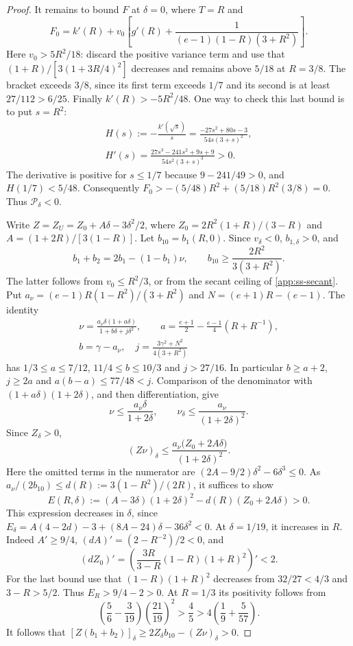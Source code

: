 \begin{proof}
It remains to bound $F$ at $\delta=0$, where $T=R$ and
\[
 F_0=k'(R)+v_0\left[g'(R)+
              \frac1{(e-1)(1-R)(3+R^2)}\right].
\]
Here $v_0>5R^2/18$: discard the positive variance term and use that
$(1+R)/[3(1+3R/4)^2]$ decreases and remains above $5/18$ at $R=3/8$.
The bracket exceeds $3/8$, since its first term exceeds $1/7$ and its second is at least
$27/112>6/25$. Finally $k'(R)>-5R^2/48$. One way to check this last bound is to put $s=R^2$:
\begin{gather*}
 H(s):=-\frac{k'(\sqrt s)}s
 =\frac{-27s^2+80s-3}{54s(3+s)^2},\\
 H'(s)=\frac{27s^3-241s^2+9s+9}{54s^2(3+s)^3}>0 .
\end{gather*}
The derivative is positive for $s\le1/7$ because $9-241/49>0$, and $H(1/7)<5/48$.
Consequently $F_0>-(5/48)R^2+(5/18)R^2(3/8)=0$. Thus $\mathcal P_\delta<0$.

 Write
$Z=Z_U=Z_0+A\delta-3\delta^2/2$, where
$Z_0=2R^2(1+R)/(3-R)$ and $A=(1+2R)/[3(1-R)]$.
Let $b_{10}=b_1(R,0)$. Since $v_\delta<0$, $b_{1,\delta}>0$, and
\[
 b_1+b_2=2b_1-(1-b_1)\nu,\qquad
 b_{10}\ge\frac{2R^2}{3(3+R^2)} .
\]
The latter follows from $v_0\le R^2/3$, or from the secant ceiling of \cref{app:ss-secant}.
Put $a_\nu=(e-1)R(1-R^2)/(3+R^2)$ and $N=(e+1)R-(e-1)$. The identity
\begin{gather*}
 \nu=\frac{a_\nu\delta(1+a\delta)}{1+b\delta+j\delta^2},\qquad
 a=\frac{e+1}{2}-\frac{e-1}{4}(R+R^{-1}),\\
 b=\gamma-a_\nu,\quad
 j=\frac{3\gamma^2+N^2}{4(3+R^2)}
\end{gather*}
has $1/3\le a\le7/12$, $11/4\le b\le10/3$ and $j>27/16$.
In particular $b\ge a+2$, $j\ge2a$ and
$a(b-a)\le77/48<j$. Comparison of the denominator with
$(1+a\delta)(1+2\delta)$, and then differentiation, give
\[
 \nu\le\frac{a_\nu\delta}{1+2\delta},\qquad
 \nu_\delta\le\frac{a_\nu}{(1+2\delta)^2}.
\]
Since $Z_\delta>0$,
\[
 (Z\nu)_\delta\le
 \frac{a_\nu\bigl(Z_0+2A\delta\bigr)}{(1+2\delta)^2}.
\]
Here the omitted terms in the numerator are
$(2A-9/2)\delta^2-6\delta^3\le0$.
As $a_\nu/(2b_{10})\le d(R):=3(1-R^2)/(2R)$, it suffices to show
\[
 E(R,\delta):=(A-3\delta)(1+2\delta)^2-d(R)(Z_0+2A\delta)>0.
\]
This expression decreases in $\delta$, since
$E_\delta=A(4-2d)-3+(8A-24)\delta-36\delta^2<0$.
At $\delta=1/19$, it increases in $R$. Indeed $A'\ge9/4$,
$(dA)'=(2-R^{-2})/2<0$, and
\[
 (dZ_0)'=
 \left(\frac{3R}{3-R}(1-R)(1+R)^2\right)'<2.
\]
For the last bound use that $(1-R)(1+R)^2$ decreases from $32/27<4/3$ and $3-R>5/2$.
Thus $E_R>9/4-2>0$. At $R=1/3$ its positivity follows from
\[
 \left(\frac56-\frac3{19}\right)\left(\frac{21}{19}\right)^2
 >\frac45>4\left(\frac19+\frac5{57}\right).
\]
It follows that
$[Z(b_1+b_2)]_\delta\ge2Z_\delta b_{10}-(Z\nu)_\delta>0$.


\end{proof}
